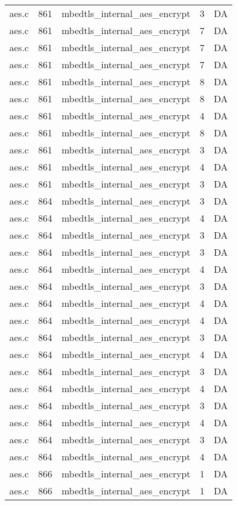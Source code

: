 \begin{table}[h!]
\begin{tabular}{lrlrr}
aes.c& 861&mbedtls\_internal\_aes\_encrypt&3 &DA\\
aes.c& 861&mbedtls\_internal\_aes\_encrypt&7 &DA\\
aes.c& 861&mbedtls\_internal\_aes\_encrypt&7 &DA\\
aes.c& 861&mbedtls\_internal\_aes\_encrypt&7 &DA\\
aes.c& 861&mbedtls\_internal\_aes\_encrypt&8 &DA\\
aes.c& 861&mbedtls\_internal\_aes\_encrypt&8 &DA\\
aes.c& 861&mbedtls\_internal\_aes\_encrypt&4 &DA\\
aes.c& 861&mbedtls\_internal\_aes\_encrypt&8 &DA\\
aes.c& 861&mbedtls\_internal\_aes\_encrypt&3 &DA\\
aes.c& 861&mbedtls\_internal\_aes\_encrypt&4 &DA\\
aes.c& 861&mbedtls\_internal\_aes\_encrypt&3 &DA\\
aes.c& 864&mbedtls\_internal\_aes\_encrypt&3 &DA\\
aes.c& 864&mbedtls\_internal\_aes\_encrypt&4 &DA\\
aes.c& 864&mbedtls\_internal\_aes\_encrypt&3 &DA\\
aes.c& 864&mbedtls\_internal\_aes\_encrypt&3 &DA\\
aes.c& 864&mbedtls\_internal\_aes\_encrypt&4 &DA\\
aes.c& 864&mbedtls\_internal\_aes\_encrypt&3 &DA\\
aes.c& 864&mbedtls\_internal\_aes\_encrypt&4 &DA\\
aes.c& 864&mbedtls\_internal\_aes\_encrypt&4 &DA\\
aes.c& 864&mbedtls\_internal\_aes\_encrypt&3 &DA\\
aes.c& 864&mbedtls\_internal\_aes\_encrypt&4 &DA\\
aes.c& 864&mbedtls\_internal\_aes\_encrypt&3 &DA\\
aes.c& 864&mbedtls\_internal\_aes\_encrypt&4 &DA\\
aes.c& 864&mbedtls\_internal\_aes\_encrypt&3 &DA\\
aes.c& 864&mbedtls\_internal\_aes\_encrypt&4 &DA\\
aes.c& 864&mbedtls\_internal\_aes\_encrypt&3 &DA\\
aes.c& 864&mbedtls\_internal\_aes\_encrypt&4 &DA\\
aes.c& 866&mbedtls\_internal\_aes\_encrypt&1 &DA\\
aes.c& 866&mbedtls\_internal\_aes\_encrypt&1 &DA\\

\end{tabular}
\end{table}
